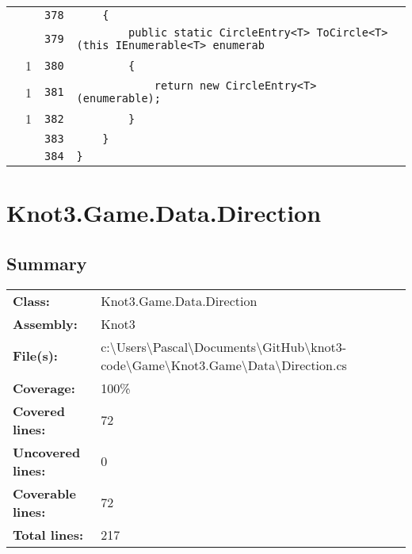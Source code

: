 \documentclass[a4paper,10pt]{article}
\begin{document}
\begin{longtable}[l]{lrrl}
\cellcolor{gray} &  & \verb~378~ & \verb~    {~\\
\cellcolor{gray} &  & \verb~379~ & \verb~        public static CircleEntry<T> ToCircle<T> (this IEnumerable<T> enumerab~\\
\cellcolor{green} & 1 & \verb~380~ & \verb~        {~\\
\cellcolor{green} & 1 & \verb~381~ & \verb~            return new CircleEntry<T> (enumerable);~\\
\cellcolor{green} & 1 & \verb~382~ & \verb~        }~\\
\cellcolor{gray} &  & \verb~383~ & \verb~    }~\\
\cellcolor{gray} &  & \verb~384~ & \verb~}~\\
\end{longtable}
\newpage
\section{Knot3.Game.Data.Direction}
\subsection{Summary}
\begin{longtable}[l]{ll}
\textbf{Class:} & Knot3.Game.Data.Direction\\
\textbf{Assembly:} & Knot3\\
\textbf{File(s):} & \begin{minipage}[t]{12cm}{c:\textbackslash Users\textbackslash Pascal\textbackslash Documents\textbackslash GitHub\textbackslash knot3-code\textbackslash Game\textbackslash Knot3.Game\textbackslash Data\textbackslash Direction.cs}\end{minipage} \\
\textbf{Coverage:} & 100\%\\
\textbf{Covered lines:} & 72\\
\textbf{Uncovered lines:} & 0\\
\textbf{Coverable lines:} & 72\\
\textbf{Total lines:} & 217\\
\end{longtable}
\end{document}
